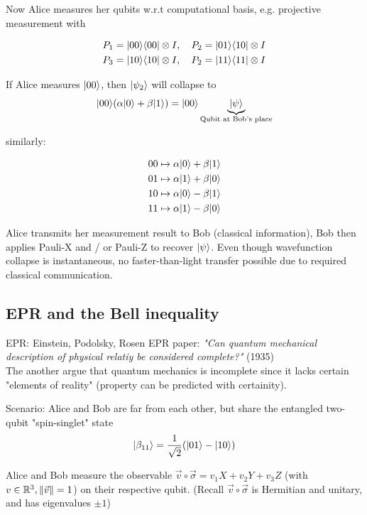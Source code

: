 Now Alice measures her qubits w.r.t computational basis, e.g. projective measurement with 

\begin{align*}
    P_1 &= \lvert00\rangle \langle00\rvert \otimes I, \quad P_2 = \lvert01\rangle \langle10\rvert \otimes I \\ 
    P_3 &= \lvert10\rangle \langle10\rvert \otimes I, \quad P_2 = \lvert11\rangle \langle11\rvert \otimes I \\ 
\end{align*}

If Alice measures $\lvert00\rangle$, then $\lvert\psi_2\rangle$ will collapse to 
\begin{equation*}
    \lvert00\rangle (\alpha \lvert0\rangle + \beta \lvert1\rangle) = \lvert00\rangle \underbrace{\lvert\psi\rangle}_{\text{Qubit at Bob's place}}
\end{equation*}

similarly:

\begin{align*}
    00 &\mapsto \alpha \lvert0\rangle + \beta \lvert1\rangle \\
    01 &\mapsto \alpha \lvert1\rangle + \beta \lvert0\rangle \\
    10 &\mapsto \alpha \lvert0\rangle - \beta \lvert1\rangle \\
    11 &\mapsto \alpha \lvert1\rangle - \beta \lvert0\rangle 
\end{align*}

Alice transmits her measurement result to Bob (classical information), Bob then applies
Pauli-X and / or Pauli-Z to recover $\lvert\psi\rangle$. Even though wavefunction collapse is 
instantaneous, no faster-than-light transfer possible due to required classical communication.

\subsection{EPR and the Bell inequality}
EPR: Einstein, Podolsky, Rosen
EPR paper: \textit{"Can quantum mechanical description of physical relatiy be considered complete?"} (1935) \\
%
The another argue that quantum mechanics is incomplete since it lacks certain "elements of reality" 
(property can be predicted with certainity).

Scenario: Alice and Bob are far from each other, but share the entangled two-qubit "spin-singlet" state
\begin{equation*}
    \lvert\beta_{11}\rangle = \frac{1}{\sqrt{2}} (\lvert01\rangle - \lvert10\rangle)
\end{equation*}

Alice and Bob measure the observable $\vec{v} \circ  \vec{\sigma} = v_1 X + v_2 Y + v_3 Z$ 
(with $v \in \mathbb{R}^3, \lVert\vec{v}\rVert = 1$) on their respective qubit.
(Recall $\vec{v} \circ \vec{\sigma}$ is Hermitian and unitary, and has eigenvalues $\pm 1$)


